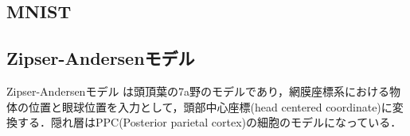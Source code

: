 \subsection{MNIST}
\subsection{Zipser-Andersenモデル}
Zipser-Andersenモデル \cite{Zipser1988-nc} は頭頂葉の7a野のモデルであり，網膜座標系における物体の位置と眼球位置を入力として，頭部中心座標(head centered coordinate)に変換する．隠れ層はPPC(Posterior parietal cortex)の細胞のモデルになっている．

